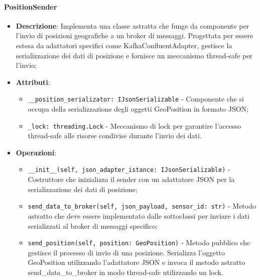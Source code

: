 \documentclass[10pt]{article}
\begin{document}
    \paragraph{PositionSender}
    \begin{itemize} 
    \item \textbf{Descrizione}: Implementa una classe astratta che funge da componente per l'invio di posizioni geografiche a un broker di messaggi. Progettata per essere estesa da adattatori specifici come KafkaConfluentAdapter, gestisce la serializzazione dei dati di posizione e fornisce un meccanismo thread-safe per l'invio;
    \item \textbf{Attributi}:
    \begin{itemize}
        \item \texttt{\_\_position\_serializator: IJsonSerializable} - Componente che si occupa della serializzazione degli oggetti GeoPosition in formato JSON;
        \item \texttt{\_lock: threading.Lock} - Meccanismo di lock per garantire l'accesso thread-safe alle risorse condivise durante l'invio dei dati.
    \end{itemize}
    
    \item \textbf{Operazioni}:
    \begin{itemize}
        \item \texttt{\_\_init\_\_(self, json\_adapter\_istance: IJsonSerializable)} - Costruttore che inizializza il sender con un adattatore JSON per la serializzazione dei dati di posizione;
        
        \item \texttt{send\_data\_to\_broker(self, json\_payload, sensor\_id: str)} - Metodo astratto che deve essere implementato dalle sottoclassi per inviare i dati serializzati al broker di messaggi specifico;
        
        \item \texttt{send\_position(self, position: GeoPosition)} - Metodo pubblico che gestisce il processo di invio di una posizione. Serializza l'oggetto GeoPosition utilizzando l'adattatore JSON e invoca il metodo astratto send\_data\_to\_broker in modo thread-safe utilizzando un lock.
    \end{itemize}
    \end{itemize}
\end{document}
